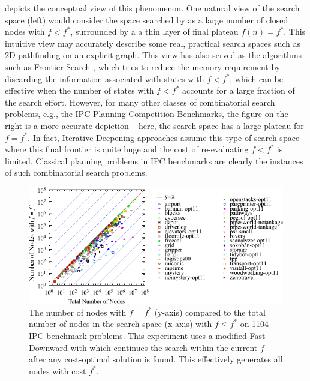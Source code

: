  depicts the conceptual view of this phenomenon.
% 
One natural  %
view of the search space (left) would consider the space searched by \astar as
a large number of closed nodes with $f<f^*$, surrounded by a
a thin layer of final plateau $f(n)=f^*$.  This intuitive view
may accurately describe some real, practical search spaces such as 2D pathfinding on an explicit
graph. This view has also served as the algorithms such as Frontier Search
\cite{korf1999divide,korf2000divide}, which tries to reduce the memory requirement by discarding the information associated with states with 
$f<f^*$, which can be effective when the number of states with $f<f^*$ accounts for a large fraction of the search effort.
% 
However, for many other classes of combinatorial search problems, e.g., the IPC Planning Competition Benchmarks, 
the figure on the right is a more accurate depiction -- here, the  search space has a large plateau for $f=f^*$.
In fact, Iterative Deepening approaches \cite{korf1985depth} assume this type of search space
where this final frontier is quite huge and the cost of re-evaluating $f<f^*$ is limited.
Classical planning problems in IPC benchmarks are clearly the instances of such combinatorial search problems.

\begin{figure}[htbp]
  \centering
  \includegraphics[width=\linewidth]{tables/aaai16-frontier/aaai16prelim3/lmcut_frontier_noh-front.pdf}
 \caption{
 The number of nodes with $f=f^*$ (y-axis) compared to the
 total number of nodes in the search space (x-axis) with $f\leq f^*$ on 1104 IPC benchmark problems.
 This experiment uses a modified Fast Downward with \lmcut which 
 continues the search within the current $f$ after any cost-optimal solution is found.
 This effectively generates all nodes with cost $f^*$.
  }
 \label{fig:plateau-noh}
\end{figure}

